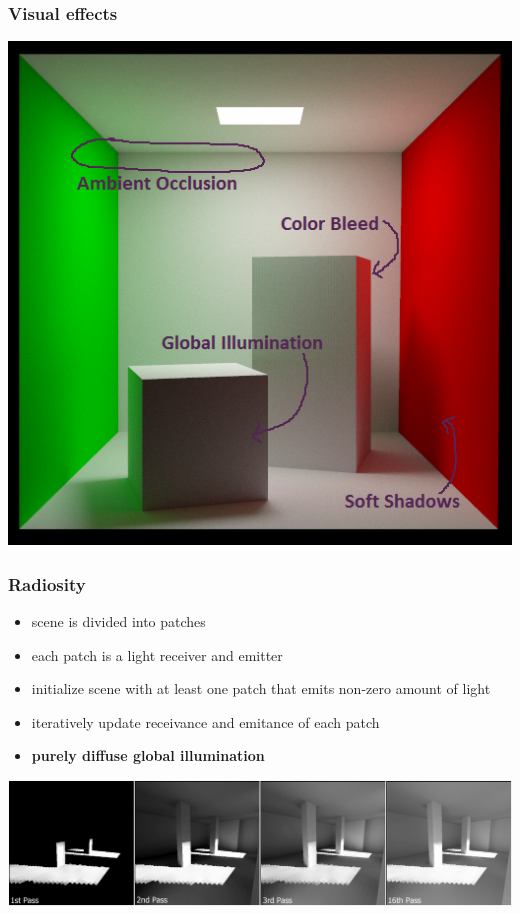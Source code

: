 \documentclass[aspectratio=169]{beamer}
\begin{document}
	\begin{frame}
		\frametitle{Visual effects}
		\begin{center}
			\includegraphics[width=.7\textwidth]{img/visual_effects.png}
		\end{center}
	\end{frame}

	\begin{frame}
		\frametitle{Radiosity}
		\begin{itemize}
			\item scene is divided into patches
			\item each patch is a light receiver and emitter 
			\item initialize scene with at least one patch that emits non-zero amount of light
			\item iteratively update receivance and emitance of each patch
			\item \textbf{purely diffuse global illumination}
		\end{itemize}

		\includegraphics[width=\textwidth]{img/radiosity.png}
	\end{frame}
\end{document}
